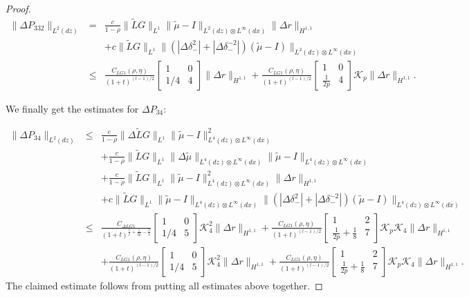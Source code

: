 \documentclass{amsart}
\theoremstyle{plain}
\theoremstyle{remark}
\numberwithin{equation}{section}
\newcommand{\Twomat}[4]
{
\left[
	\begin{array}{cc}
		{#1}	&	{#2}	\\[10pt]
		{#3}	&	{#4}
		\end{array}
\right]
}
\begin{document}
\begin{proof}
    \begin{eqnarray*}
    \|\Delta P_{332}\|_{L^{2}(dz)} &=& \frac{c}{1-\rho}\|\tilde{L}G\|_{L^1}\|\tilde{\mu}-I\|_{L^2(dz) \otimes L^\infty(dx)}\|\Delta r\|_{H^{1,1}}\\
    &&+c\|\tilde{L}G\|_{L^1}\|(|\Delta \delta_-^2|+|\Delta \delta_-^{-2}|)(\tilde{\mu}-I)\|_{L^2(dz) \otimes L^\infty(dx)}\\
    &\leq& \frac{C_{LG1}(\rho, \eta)}{(1+t)^{(l-1)/2}}\Twomat{1}{0}{1/4}{4}\|\Delta r\|_{H^{1,1}}+\frac{C_{LG1}(\rho, \eta)}{(1+t)^{(l-1)/2}}\Twomat{1}{0}{\frac{1}{2p}}{4}\mathcal{K}_{p}\|\Delta r\|_{H^{1,1}}.
    \end{eqnarray*}

   We finally get the estimates for $\Delta P_{34}$:

    \begin{eqnarray*}
    \|\Delta P_{34}\|_{L^{2}(dz)} &\leq& \frac{c}{1-\rho}\|\Delta \tilde{L}G\|_{L^1}\|\tilde{\mu}-I\|_{L^4(dz) \otimes L^\infty(dx)}^2\\
    &&+\frac{c}{1-\rho}\|\tilde{L}G\|_{L^1}\|\Delta \tilde{\mu}\|_{L^4(dz) \otimes L^\infty(dx)}\|\tilde{\mu}-I\|_{L^4(dz) \otimes L^\infty(dx)}\\
    &&+\frac{c}{1-\rho}\|\tilde{L}G\|_{L^1}\|\tilde{\mu}-I\|_{L^4(dz) \otimes L^\infty(dx)}^2\|\Delta r\|_{H^{1,1}}\\
    &&+c\|\tilde{L}G\|_{L^1}\|\tilde{\mu}-I\|_{L^4(dz) \otimes L^\infty(dx)}\|(|\Delta \delta_-^2|+|\Delta \delta_-^{-2}|)(\tilde{\mu}-I)\|_{L^4(dz) \otimes L^\infty(dx)}\\
    &\leq& \frac{C_{\Delta LG1}}{(1+t)^{\frac{l}{2}+\frac{1}{2p}-\frac{3}{4}}}\Twomat{1}{0}{1/4}{5}\mathcal{K}_4^2\|\Delta r\|_{H^{1,1}}+\frac{C_{LG1}(\rho, \eta)}{(1+t)^{(l-1)/2}}\Twomat{1}{2}{\frac{1}{2p}+\frac{1}{8}}{7}\mathcal{K}_{p}\mathcal{K}_{4}\|\Delta r\|_{H^{1,1}}\\
    &&+\frac{C_{LG1}(\rho, \eta)}{(1+t)^{(l-1)/2}}\Twomat{1}{0}{1/4}{5}\mathcal{K}_4^2\|\Delta r\|_{H^{1,1}}+\frac{C_{LG1}(\rho, \eta)}{(1+t)^{(l-1)/2}}\Twomat{1}{2}{\frac{1}{2p}+\frac{1}{8}}{7}\mathcal{K}_p\mathcal{K}_{4}\|\Delta r\|_{H^{1,1}}.
    \end{eqnarray*}
The claimed estimate follows from putting all estimates above together.
    

    

    

    
\end{proof}
\end{document}
